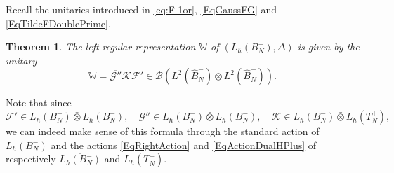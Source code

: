 \documentclass[11pt, reqno]{amsart}
\newtheorem{theorem}{Theorem}[section]
\theoremstyle{definition}
\numberwithin{equation}{section}
\def\Fc{\mathcal F'}
\newcommand{\Bc}{\mathcal{B}}
\newcommand{\Kc}{\mathcal{K}}
\newcommand{\tFctt}{\mathcal{G}''}
\newcommand{\Bor}{B}
\newcommand{\Tor}{T}
\newcommand{\Wbb}{\mathbb{W}}
\begin{document}
Recall the unitaries introduced in \eqref{eq:F-1or}, \eqref{EqGaussFG} and \eqref{EqTildeFDoublePrime}.

\begin{theorem} \label{TheoKacTakesakiop}
The left regular representation $\Wbb$ of $(L_{\hbar}(\Bor_N^-),\Delta)$ is given by the unitary 
\begin{equation}\label{EqFormRegMultUni}
\Wbb =  \overline{\tFctt} \Kc \Fc\in \Bc(L^2(\hat{\Bor}_N^-)\otimes L^2(\hat{\Bor}_N^-)). 
\end{equation}
\end{theorem}
Note that since 
\[
\Fc \in L_{\hbar}(\Bor_N^-)\bar{\otimes}L_{\hbar}(\Bor_N^-),\quad \overline{\tFctt}\in L_{\hbar}(\Bor_N^-)\bar{\otimes} \overline{L_{\hbar}(\Bor_N^-)},\quad \Kc \in L_{\hbar}(\Bor_N^-) \bar{\otimes} L_{\hbar}(\Tor_N^+),
\]
we can indeed make sense of this formula through the standard action of $L_{\hbar}(\Bor_N^-)$ and the actions \eqref{EqRightAction} and \eqref{EqActionDualHPlus} of respectively $\overline{L_{\hbar}(\Bor_N^-)}$ and $L_{\hbar}(\Tor_N^+)$. 
\end{document}
